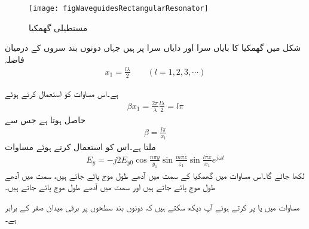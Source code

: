 \begin{figure}
\centering
\texttt{[image: figWaveguidesRectangularResonator]}
\caption{مستطیلی گھمکیا}
\label{شکل_مویج_مستطیل_گھمکیا}
\end{figure}
شکل  میں گھمکیا کا بایاں سرا  اور دایاں سرا  پر ہیں جہاں دونوں بند سروں کے درمیان فاصلہ
\begin{align}\label{مساوات_مویج_گھمکیا_لمبائی_شرط}
x_1=\frac{l \lambda}{2}  \quad \quad (l=1,2,3,\cdots)
\end{align}

ہے۔اس مساوات کو استعمال کرتے ہوئے
\begin{align*}
\beta x_1 = \frac{2\pi}{\lambda} \frac{l \lambda}{2}=l \pi
\end{align*}
حاصل ہوتا ہے جس سے
\begin{align}\label{مساوات_مویج_گھمکی_زاویائی_مستقل}
\beta=\frac{l \pi}{x_1}
\end{align}
ملتا ہے۔اس کو استعمال کرتے ہوئے مساوات  
\begin{align}\label{مساوات_مویج_گھمکی_برقی_ب}
E_y=-j 2 E_{y0}\cos \frac{n\pi y}{y_1} \sin \frac{m \pi z}{z_1} \sin \frac{l \pi x}{x_1}  e^{j\omega t}
\end{align}
لکھا جائے گا۔اس مساوات میں گھمکیا کے  سمت میں  آدھے طول موج پائے جاتے ہیں،  سمت میں  آدھے طول موج پائے جاتے ہیں اور  سمت میں  آدھے طول موج پائے جاتے ہیں۔

مساوات  میں  یا  پر کرتے ہوئے آپ دیکھ سکتے ہیں کہ دونوں بند سطحوں پر برقی میدان صفر کے برابر ہے۔

